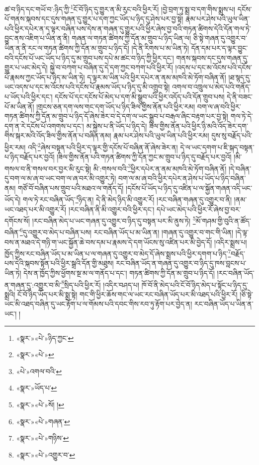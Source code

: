 ཚ་བ་ཉིད་དང་གཡོ་བ་:ཉིད་ཀྱི་\footnote{«སྣར་»«པེ་»ཉིད་ཀྱང་}ངོ་བོ་ཉིད་དུ་གྱུར་ན་མི་རུང་བའི་ཕྱིར་རོ། །བྱེ་བྲག་ཏུ་སྨྲ་བ་དག་གིས་སྨྲས་པ། དངོས་པོ་གནས་སྐབས་དང་དུས་གཞན་དུ་གྱུར་པ་དག་ཀྱང་ཡོད་པ་ཉིད་དུ་ཤེས་པར་བྱ་སྟེ། རྣམ་པར་ཤེས་པའི་ཡུལ་ཡིན་པའི་ཕྱིར་དཔེར་ན་ད་ལྟར་བཞིན་པས་དེས་ན་གཞན་དུ་གྱུར་པའི་ཕྱིར་ཞེས་བྱ་བའི་གཏན་ཚིགས་དེའི་དོན་གལ་ཏེ་བྱུང་ནས་འཇིག་པ་ཡིན་ན་ནི། གཞན་ལ་གཏན་ཚིགས་ཀྱི་དོན་མ་གྲུབ་པ་ཉིད་ཡིན་ལ། ཅི་སྟེ་གཞན་དུ་འགྱུར་བ་ཡིན་ན་ནི་རང་ལ་གཏན་ཚིགས་ཀྱི་དོན་མ་གྲུབ་པ་ཉིད་དོ། །དེ་ནི་རིགས་པ་མ་ཡིན་ཏེ། དོན་དམ་པར་ད་ལྟར་བྱུང་བའི་དངོས་པོ་ཡང་ཡོད་པ་ཉིད་དུ་མ་གྲུབ་པས་དཔེ་མ་ཚང་བ་ཉིད་ཀྱི་ཕྱིར་དང་། གནས་སྐབས་དང་དུས་གཞན་དུ་གྱུར་པ་ཡང་མེད་དེ། སྐྱེ་བ་བཀག་པ་བཞིན་དུ་དེ་དག་ཀྱང་བཀག་པའི་ཕྱིར་རོ། །འདས་པ་དང་མ་འོངས་པའི་དངོས་པོ་རྣམས་ཀྱང་ཡོད་པ་ཉིད་མ་ཡིན་ཏེ། ད་ལྟར་མ་ཡིན་པའི་ཕྱིར་དཔེར་ན་ནམ་མཁའི་མེ་ཏོག་བཞིན་ནོ། །ཐ་སྙད་དུ་ཡང་འདས་པ་དང་མ་འོངས་པའི་དངོས་པོ་རྣམས་ཡོད་པ་ཉིད་དུ་མི་འགྲུབ་སྟེ། འགལ་བ་འཁྲུལ་པ་མེད་པའི་གནོད་པ་ཡོད་པའི་ཕྱིར་དང་། དངོས་པོ་དང་དངོས་པོ་མེད་པ་དག་མི་སྒྲུབ་པའི་ཕྱིར་འདོད་པའི་དོན་གྲུབ་པས། དེ་ནི་བཟང་པོ་མ་ཡིན་ནོ། །གྲངས་ཅན་དག་ལས་གང་དག་ཡོད་པ་ཉིད་ཟིལ་གྱིས་ནོན་པའི་ཕྱིར་རམ། བག་ལ་ཞ་བའི་ཕྱིར་གཏན་ཚིགས་ཀྱི་དོན་མ་གྲུབ་པ་ཉིད་དོ་ཞེས་ཟེར་བ་དེ་དག་ལ་ཡང་སྒྲུབ་པ་བརྒལ་ཞིང་བརྟག་པར་བྱ་སྟེ། གལ་ཏེ་དེ་དག་ན་རེ་དངོས་པོ་འགགས་པ་དང་། མ་སྐྱེས་པ་ནི་ཡོད་པ་ཉིད་དེ། ཟིལ་གྱིས་ནོན་པའི་ཕྱིར་ཉི་མའི་འོད་ཟེར་དག་གིས་སྐར་མའི་འོད་ཟིལ་གྱིས་ནོན་པ་བཞིན་ནམ། རྣམ་པར་ཤེས་པའི་ཡུལ་ཡིན་པའི་ཕྱིར་རམ། དུས་སུ་བརྗོད་པའི་ཕྱིར་རམ། འདི་\footnote{«སྣར་»«པེ་»}ཞེས་བསྟན་པའི་ཕྱིར་ད་ལྟར་གྱི་དངོས་པོ་བཞིན་ནོ་ཞེས་ཟེར་ན། དེ་ལ་ཡང་དགག་པ་ཇི་སྐད་བསྟན་པ་ཉིད་བརྗོད་པར་བྱའོ། །ཟིལ་གྱིས་ནོན་པའི་གཏན་ཚིགས་ཀྱི་དོན་ཀྱང་མ་གྲུབ་པ་ཉིད་དུ་བརྗོད་པར་བྱའོ། །མི་གསལ་བ་ནི་གསལ་བར་བྱར་མི་རུང་སྟེ། མི་:གསལ་བའི་\footnote{«པེ་»འགལ་བའི་}ཕྱིར་དཔེར་ན་ནམ་མཁའི་མེ་ཏོག་བཞིན་ནོ། །དེ་བཞིན་དུ་བག་ལ་མ་ཞ་བ་ཡང་བག་ལ་ཞ་བར་མི་འགྱུར་ཏེ། བག་ལ་མ་ཞ་བའི་ཕྱིར་དཔེར་ན་ཤེས་པ་ཡོད་པ་ཉིད་བཞིན་ནམ། གཙོ་བོ་བཞིན་པས་གྲུབ་པའི་མཐའ་ལ་གནོད་དོ། །དངོས་པོ་ཡོད་པ་ཉིད་དུ་འཛིན་པ་ལ་སྐྱོན་གཞན་འདི་ཡང་ཡོད་དེ། གལ་ཏེ་རང་བཞིན་ཡོད་\footnote{«སྣར་»ཡོད་པ་}ཉིད་ན། དེ་ནི་མེད་ཉིད་མི་འགྱུར་རོ། །རང་བཞིན་གཞན་དུ་འགྱུར་བ་ནི། །ནམ་ཡང་འཐད་པར་མི་འགྱུར་རོ། །རང་བཞིན་ནི་མི་འགྱུར་བའི་ཕྱིར་དང་། དཔེ་ཡང་མེད་པའི་ཕྱིར་རོ་ཞེས་བྱ་བར་དགོངས་སོ། །རང་བཞིན་མེད་པ་ཡང་གཞན་དུ་འགྱུར་བ་ཉིད་དུ་བསྟན་པར་མི་ནུས་ཏེ། \footnote{«སྣར་»«པེ་»སོ། ། }མོ་གཤམ་གྱི་བུའི་ན་ཚོད་བཞིན་\footnote{«སྣར་»«པེ་»གཞན་}དུ་འགྱུར་བ་མེད་པ་བཞིན་པས། རང་བཞིན་ཡོད་པ་མ་ཡིན་ན། །གཞན་དུ་འགྱུར་བ་གང་གི་ཡིན། །དེ་ལྟ་བས་ན་མཐའ་དེ་གཉི་ག་ཡང་སྐྱོན་ཆེ་བས་དམ་པ་རྣམས་དེ་དག་ཡོངས་སུ་འཛིན་པར་མི་བྱེད་དོ། །འདིར་སྨྲས་པ། ཁྱོད་ཀྱིས་རང་བཞིན་ཡོད་པ་མ་ཡིན་པ་ལ་གཞན་དུ་འགྱུར་བ་མེད་དོ་ཞེས་སྨྲས་པའི་ཕྱིར་དགག་པ་ཉིད་\footnote{«སྣར་»«པེ་»གཉིས་}བརྗོད་པས་དེའི་སྐབས་སྟོན་པའི་ཕྱིར་སྒྲའི་དོན་གྱི་མཐུས། རང་བཞིན་ཡོད་ན་གཞན་དུ་འགྱུར་བ་ཉིད་དུ་ཁས་བླངས་པ་ཡིན་ཏེ། དེས་ན་ཁྱོད་ཀྱིས་ཕྱོགས་སྔ་མ་ལ་གནོད་པ་དང་། གཏན་ཚིགས་ཀྱི་དོན་མ་གྲུབ་པ་ཉིད་དོ། །རང་བཞིན་ཡོད་ན་གཞན་དུ་:འགྱུར་བ་མི་\footnote{«སྣར་»«པེ་»འགྱུར་བ་}སྲིད་པའི་ཕྱིར་རོ། །འདིར་བཤད་པ། ཁོ་བོ་ནི་མེད་པའི་ངོ་བོ་ཉིད་མེད་པ་སྟོང་པ་ཉིད་དུ་སྨྲའི། ངོ་བོ་ཉིད་ཡོད་པར་མི་སྨྲ་སྟེ། གང་གི་ཕྱིར་ཆོས་གང་ལ་ཡང་རང་བཞིན་ཡོད་པར་མི་འཐད་པའི་ཕྱིར་རོ། །ཅི་སྟེ་ཡང་མི་འཐད་བཞིན་དུ་ཡང་རྟོག་པ་ལ་གོམས་པའི་དབང་གིས་རབ་ཏུ་རྟོག་པར་བྱེད་ན། རང་བཞིན་ཡོད་པ་ཡིན་ན་ཡང་། །

